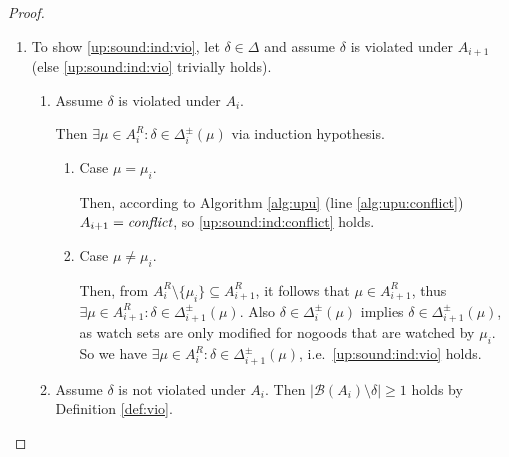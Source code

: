 \documentclass{vutinfth} %
\newcommand{\bass}{\mathcal{B}}
\newcommand{\ass}{A}
\newcommand{\bT}{\mathbf{T}}
\newcommand{\bF}{\mathbf{F}}
\newcommand{\dpm}{\Delta^\pm}
\newcommand{\headf}{H}
\newcommand{\bodyf}{B}
\newcommand{\sgl}{\mu}
\newcommand{\bsgl}{\sigma}
\begin{document}
\begin{proof}
\begin{enumerate}
\begin{enumerate}
\end{enumerate}

\item To show \ref{up:sound:ind:vio}, let $\delta \in \Delta$ and assume $\delta$ is violated under $A_{i+1}$ (else \ref{up:sound:ind:vio} trivially holds).
\begin{enumerate}
\item Assume $\delta$ is violated under $A_i$.

Then $\exists \sgl \in \ass_i^R : \delta \in \dpm_i(\sgl)$ via induction hypothesis.
\begin{enumerate}
\item Case $\sgl = \sgl_i$.

Then, according to Algorithm \ref{alg:upu} (line \ref{alg:upu:conflict}) $A_{i+1} = \emph{conflict}$, so \ref{up:sound:ind:conflict} holds.

\item Case $\sgl \not = \sgl_i$.

Then, from $\ass_{i}^R \setminus \{ \sgl_i \} \subseteq \ass_{i+1}^R$, it follows that $\sgl \in \ass_{i+1}^R$, thus $\exists \sgl \in \ass_{i+1}^R : \delta \in \dpm_{i+1}(\sgl)$. Also $\delta \in \dpm_i(\sgl)$ implies $\delta \in \dpm_{i+1}(\sgl)$, as watch sets are only modified for nogoods that are watched by $\sgl_i$. So we have $\exists \sgl \in \ass_i^R : \delta \in \dpm_{i+1}(\sgl)$, i.e.~\ref{up:sound:ind:vio} holds.
\end{enumerate}
\item Assume $\delta$ is not violated under $A_i$. Then $|\bass(A_i) \setminus \delta| \geq 1$  holds by Definition \ref{def:vio}.


\end{enumerate}
\end{enumerate}
\end{proof}
\end{document}
